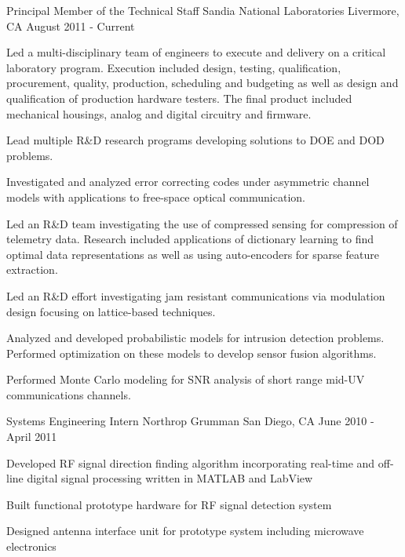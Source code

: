 \begin{cventries}
\cventry
{Principal Member of the Technical Staff} %
{Sandia National Laboratories} %
{Livermore, CA} %
{August 2011 - Current} %
{
  \begin{cvitems} %
    \item {Led a multi-disciplinary team of engineers to execute and delivery on a critical laboratory program. Execution included design, testing, qualification, procurement, quality, production, scheduling and budgeting as well as design and qualification of production hardware testers. The final product included mechanical housings, analog and digital circuitry and firmware.}
    \item {Lead multiple R\&D research programs developing solutions to DOE and DOD problems.}
    \item {Investigated and analyzed error correcting codes under asymmetric channel models with applications to free-space optical communication.}
    \item {Led an R\&D team investigating the use of compressed sensing for compression of telemetry data. Research included applications of dictionary learning to find optimal data representations as well as using auto-encoders for sparse feature extraction.}
    \item {Led an R\&D effort investigating jam resistant communications via modulation design focusing on lattice-based techniques.}
    \item {Analyzed and developed probabilistic models for intrusion detection problems. Performed optimization on these models to develop sensor fusion algorithms.}
    \item {Performed Monte Carlo modeling for SNR analysis of short range mid-UV communications channels.}
  \end{cvitems}
}

\cventry
{Systems Engineering Intern} %
{Northrop Grumman} %
{San Diego, CA} %
{June 2010 - April 2011} %
{
  \begin{cvitems} %
    \item {Developed RF signal direction finding algorithm incorporating real-time and off-line digital signal processing written in MATLAB and LabView}
    \item {Built functional prototype hardware for RF signal detection system}
    \item {Designed antenna interface unit for prototype system including microwave electronics}
  \end{cvitems}
}


\end{cventries}
